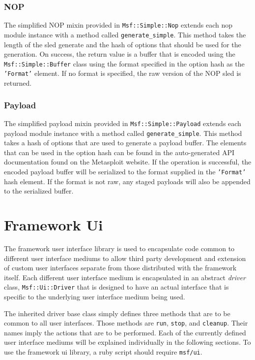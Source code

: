 \documentclass{report}
\begin{document}
        \subsection{NOP}

\par
The simplified NOP mixin provided in \texttt{Msf::Simple::Nop}
extends each nop module instance with a method called
\texttt{generate\_simple}.  This method takes the length of the sled
generate and the hash of options that should be used for the
generation.  On success, the return value is a buffer that is
encoded using the \texttt{Msf::Simple::Buffer} class using the
format specified in the option hash as the \texttt{'Format'}
element.  If no format is specified, the raw version of the NOP sled
is returned.

        \subsection{Payload}

\par
The simplified payload mixin provided in
\texttt{Msf::Simple::Payload} extends each payload module instance
with a method called \texttt{generate\_simple}.  This method takes a
hash of options that are used to generate a payload buffer.  The
elements that can be used in the option hash can be found in the
auto-generated API documentation found on the Metasploit website. If
the operation is successful, the encoded payload buffer will be
serialized to the format supplied in the \texttt{'Format'} hash
element.  If the format is not raw, any staged payloads will also be
appended to the serialized buffer.

\chapter{Framework Ui}

\par
The framework user interface library is used to encapsulate code
common to different user interface mediums to allow third party
development and extension of custom user interfaces separate from
those distributed with the framework itself.  Each different user
interface medium is encapsulated in an abstract \textit{driver}
class, \texttt{Msf::Ui::Driver} that is designed to have an actual
interface that is specific to the underlying user interface medium
being used.

\par
The inherited driver base class simply defines three methods that
are to be common to all user interfaces.  Those methods are
\texttt{run}, \texttt{stop}, and \texttt{cleanup}.  Their names
imply the actions that are to be performed.  Each of the currently
defined user interface mediums will be explained individually in the
following sections.  To use the framework ui library, a ruby script
should require \texttt{msf/ui}.
\end{document}
